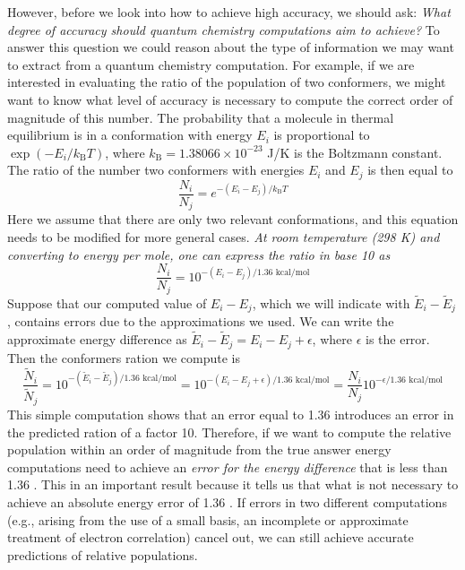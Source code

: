 \documentclass[../Main/chem371-notes.tex]{subfiles}
\begin{document}
However, before we look into how to achieve high accuracy, we should ask: \emph{What degree of accuracy should quantum chemistry computations aim to achieve?}
To answer this question we could reason about the type of information we may want to extract from a quantum chemistry computation.
For example, if we are interested in evaluating the ratio of the population of two conformers, we might want to know what level of accuracy is necessary to compute the correct order of magnitude of this number.
The probability that a molecule in thermal equilibrium is in a conformation with energy $E_i$ is proportional to $\exp(-E_i  / k_\mathrm{B} T)$, where $k_\mathrm{B} = 1.38066 \times 10^{-23}$ J/K is the Boltzmann constant. 
The ratio of the number two conformers with energies $E_i$ and $E_j$ is then equal to
\begin{equation}
\frac{N_i}{N_j} = e^{- (E_i - E_j) / k_\mathrm{B} T}
\end{equation}
Here we assume that there are only two relevant conformations, and this equation needs to be modified for more general cases.
\emph{At room temperature (298 K) and converting to energy per mole, one can express the ratio in base 10 as}
\begin{equation}
\frac{N_i}{N_j} = 10^{- (E_i - E_j) / 1.36 \text{ kcal/mol}}
\end{equation}
Suppose that our computed value of $E_i - E_j$, which we will indicate with $\tilde{E}_i - \tilde{E}_j$, contains errors due to the approximations we used.
We can write the approximate energy difference as $\tilde{E}_i - \tilde{E}_j = E_i - E_j + \epsilon$, where $\epsilon$ is the error.
Then the conformers ration we compute is
\begin{equation}
\frac{\tilde{N}_i}{\tilde{N}_j} = 10^{- (\tilde{E}_i - \tilde{E}_j) / 1.36 \text{ kcal/mol}} = 10^{- (E_i - E_j + \epsilon) / 1.36 \text{ kcal/mol}}
= \frac{N_i}{N_j} 10^{-  \epsilon / 1.36 \text{ kcal/mol}}
\end{equation}
This simple computation shows that an error equal to 1.36 \kcal introduces an error in the predicted ration of a factor 10.
Therefore, if we want to compute the relative population within an order of magnitude from the true answer energy computations need to achieve an \emph{error for the energy difference} that is less than 1.36 \kcal.
This in an important result because it tells us that what is not necessary to achieve an absolute energy error of 1.36 \kcal.
If errors in two different computations (e.g., arising from the use of a small basis, an incomplete or approximate treatment of electron correlation) cancel out, we can still achieve accurate predictions of relative populations.
\end{document}
